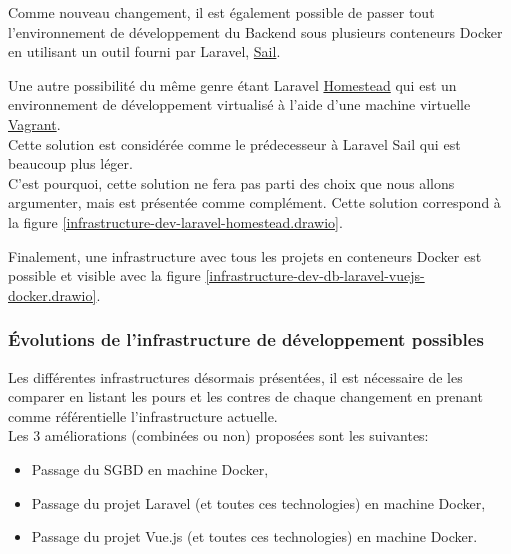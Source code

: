 \documentclass[
    iai, %
    il, %
]{heig-tb}
\begin{document}
Comme nouveau changement, il est également possible de passer tout l'environnement de développement
du Backend sous plusieurs conteneurs Docker en utilisant un outil fourni par Laravel, \href{https://laravel.com/docs/9.x/sail}{Sail}.

Une autre possibilité du même genre étant Laravel
\href{https://laravel.com/docs/9.x/homestead}{Homestead} qui est un environnement de développement
virtualisé à l'aide d'une machine virtuelle \href{https://www.vagrantup.com/}{Vagrant}.\\
Cette solution est considérée comme le prédecesseur à Laravel Sail qui est beaucoup plus léger.\\
C'est pourquoi, cette solution ne fera pas parti des choix que nous allons argumenter, mais est
présentée comme complément. Cette solution correspond à la figure \ref{infrastructure-dev-laravel-homestead.drawio}.

Finalement, une infrastructure avec tous les projets en conteneurs Docker est possible et visible
avec la figure \ref{infrastructure-dev-db-laravel-vuejs-docker.drawio}.


\clearpage

\subsubsection{Évolutions de l'infrastructure de développement possibles}
Les différentes infrastructures désormais présentées, il est nécessaire de les comparer en listant les pours et les contres de chaque changement en prenant comme référentielle l'infrastructure actuelle.\\
Les 3 améliorations (combinées ou non) proposées sont les suivantes:
\begin{itemize}
    \item Passage du SGBD en machine Docker,
    \item Passage du projet Laravel (et toutes ces technologies) en machine Docker,
    \item Passage du projet Vue.js (et toutes ces technologies) en machine Docker.
\end{itemize}
\end{document}
